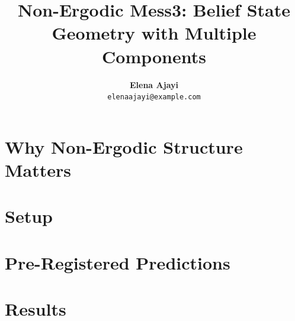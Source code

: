 \documentclass[midterm]{sparreport}
\title{Non-Ergodic Mess3: Belief State Geometry with Multiple Components}
\author{
  \textbf{Elena Ajayi}\\
  \texttt{elenaajayi@example.com}
}
\begin{document}
\maketitle

\begin{abstract}
\end{abstract}


\section{Why Non-Ergodic Structure Matters}


\section{Setup}


\section{Pre-Registered Predictions}

%

\section{Results}
\end{document}
